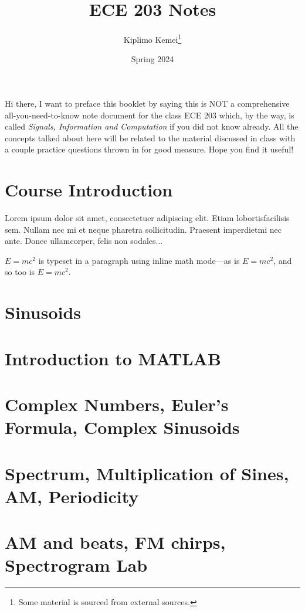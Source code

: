 \documentclass[12pt, letterpaper]{article}
\title{ECE 203 Notes}
\author{Kiplimo Kemei\thanks{Some material is sourced from external sources.}}
\date{Spring 2024}
\begin{document}
\maketitle
Hi there, I want to preface this booklet by saying this is NOT a comprehensive 
all-you-need-to-know note document for the class ECE 203 which,
by the way, is called \emph{Signals, Information and Computation} if you 
did not know already. All the concepts talked about here will 
be related to the material discussed in class with a couple practice 
questions thrown in for good measure. Hope you find it useful!

\newpage
\thispagestyle{plain}
\tableofcontents
\newpage
\thispagestyle{plain}
\section{Course Introduction}      
Lorem  ipsum  dolor  sit  amet,  consectetuer  adipiscing  
elit.   Etiam  lobortisfacilisis sem.  Nullam nec mi et 
neque pharetra sollicitudin.  Praesent imperdietmi nec ante. 
Donec ullamcorper, felis non sodales...

\space
\begin{math}
    E=mc^2
\end{math} is typeset in a paragraph using inline math mode---as is $E=mc^2$, and so too is \(E=mc^2\).

\newpage

\section{Sinusoids}   
\thispagestyle{plain}
\newpage
\section{Introduction to MATLAB}  
\thispagestyle{plain}

\newpage
\section{Complex Numbers, Euler's Formula, Complex Sinusoids} 

\newpage
\section{Spectrum, Multiplication of Sines, AM, Periodicity}

\newpage
\section{AM and beats, FM chirps, Spectrogram Lab}
\end{document}
